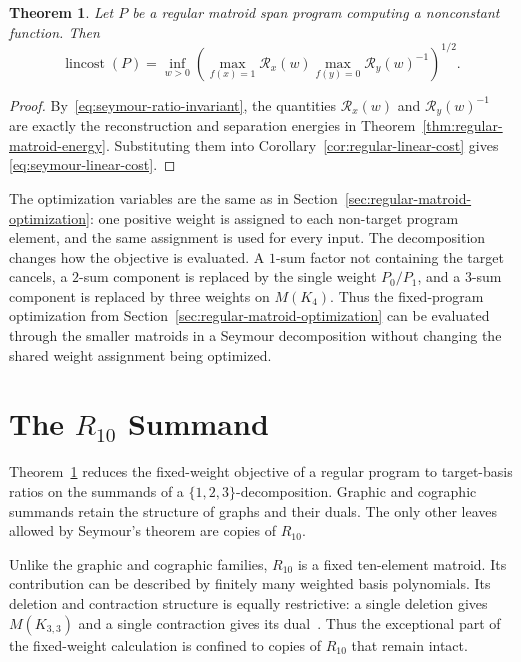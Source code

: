 \documentclass[11pt]{article}
\numberwithin{equation}{section}
\newtheorem{theorem}[definition]{Theorem}
\theoremstyle{remark}
\begin{document}
\begin{theorem}
\label{thm:seymour-linear-cost}
Let $P$ be a regular matroid span program computing a nonconstant function.
Then
\begin{equation}
    \operatorname{lincost}(P)
    =
    \inf_{w>0}
    \left(
        \max_{f(x)=1}\mathscr R_x(w)
        \max_{f(y)=0}\mathscr R_y(w)^{-1}
    \right)^{1/2}.
    \label{eq:seymour-linear-cost}
\end{equation}
\end{theorem}

\begin{proof}
By~\eqref{eq:seymour-ratio-invariant}, the quantities
$\mathscr R_x(w)$ and $\mathscr R_y(w)^{-1}$ are exactly the reconstruction
and separation energies in Theorem~\ref{thm:regular-matroid-energy}.
Substituting them into Corollary~\ref{cor:regular-linear-cost} gives
\eqref{eq:seymour-linear-cost}.
\end{proof}

The optimization variables are the same as in
Section~\ref{sec:regular-matroid-optimization}: one positive weight is
assigned to each non-target program element, and the same assignment is used
for every input. The decomposition changes how the objective is evaluated.
A $1$-sum factor not containing the target cancels, a $2$-sum component is replaced by the
single weight $P_0/P_1$, and a $3$-sum component is replaced by three weights
on $M(K_4)$. Thus the fixed-program optimization from Section~\ref{sec:regular-matroid-optimization} can be
evaluated through the smaller matroids in a Seymour decomposition without
changing the shared weight assignment being optimized.


\section{The \texorpdfstring{$R_{10}$}{R10} Summand}
\label{sec:r10-summand}

Theorem~\ref{thm:seymour-linear-cost} reduces the fixed-weight objective of a
regular program to target-basis ratios on the summands of a
$\{1,2,3\}$-decomposition. Graphic and cographic summands retain the
structure of graphs and their duals. The only other leaves allowed by
Seymour's theorem are copies of $R_{10}$.

Unlike the graphic and cographic families, $R_{10}$ is a fixed ten-element
matroid. Its contribution can be described by finitely many
weighted basis polynomials. Its deletion and contraction structure is equally
restrictive: a single deletion gives $M(K_{3,3})$ and a single contraction
gives its dual~\cite[Lem.~6.6.9]{Oxley2011}. Thus the exceptional part of the
fixed-weight calculation is confined to copies of $R_{10}$ that remain intact.
\end{document}

